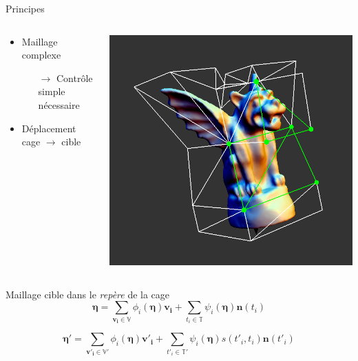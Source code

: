 \documentclass{beamer}
\begin{document}
\begin{frame}{Principes}

\begin{columns}

	\begin{column}{.7\textwidth}
	
\begin{itemize}
\item Maillage complexe
	\begin{itemize}
		\item[$\rightarrow$]Contrôle simple nécessaire
	\end{itemize}
\item Déplacement cage $\rightarrow$ cible
\end{itemize}

	\end{column}

	\begin{column}{.3\textwidth}
		\includegraphics[width=\textwidth]{gargoyle}
	\end{column}
\end{columns}
\begin{block}{Maillage cible dans le \textit{repère} de la cage}
\begin{equation}
\label{eq:linear}
\mathbf{\eta} = \sum_{\mathbf{v_i} \in \mathbb{V}} \phi_i \left( \mathbf{\eta} \right) \mathbf{v_i} 
+ \sum_{t_i \in \mathbb{T}} \psi_i \left( \mathbf{\eta} \right) \mathbf{n} \left( t_i \right)
\end{equation}

\begin{equation}
\label{eq:def}
\mathbf{\eta'} = \sum_{\mathbf{v'_i} \in \mathbb{V}'} \phi_i \left( \mathbf{\eta} \right) \mathbf{v'_i} 
+ \sum_{t'_i \in \mathbb{T}'} \psi_i \left( \mathbf{\eta} \right) s \left(t'_i, t_i \right) \mathbf{n} \left( t'_i \right)
\end{equation}
\end{block}

\end{frame}
\end{document}
